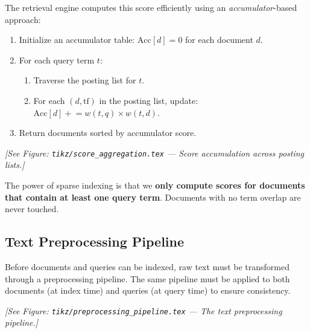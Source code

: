 \documentclass[aspectratio=169]{beamer} \usetheme{TUDelft} %
\theoremstyle{definition}
\theoremstyle{plain}
\begin{document}
The retrieval engine computes this score efficiently using an \emph{accumulator}-based approach:

\begin{enumerate}
    \item Initialize an accumulator table: $\mathrm{Acc}[d] = 0$ for each document $d$.
    \item For each query term $t$:
    \begin{enumerate}
        \item Traverse the posting list for $t$.
        \item For each $(d, \mathrm{tf})$ in the posting list, update: $\mathrm{Acc}[d] \mathrel{+}= w(t, q) \times w(t, d)$.
    \end{enumerate}
    \item Return documents sorted by accumulator score.
\end{enumerate}

\begin{center}
\textit{[See Figure: \texttt{tikz/score\_aggregation.tex} --- Score accumulation across posting lists.]}
\end{center}

\begin{keytakeaway}
The power of sparse indexing is that we \textbf{only compute scores for documents that contain at least one query term}. Documents with no term overlap are never touched.
\end{keytakeaway}


\subsection{Text Preprocessing Pipeline}
\label{sec:preprocessing}

Before documents and queries can be indexed, raw text must be transformed through a preprocessing pipeline. The same pipeline must be applied to both documents (at index time) and queries (at query time) to ensure consistency.

\begin{center}
\textit{[See Figure: \texttt{tikz/preprocessing\_pipeline.tex} --- The text preprocessing pipeline.]}
\end{center}
\end{document}
